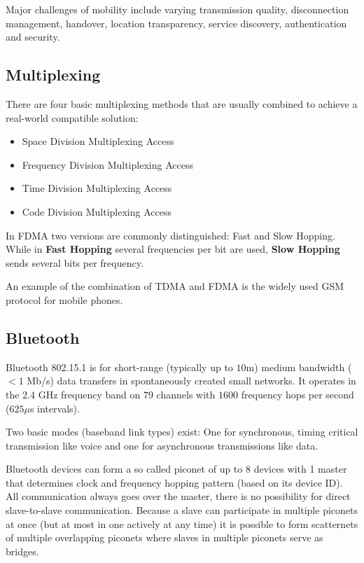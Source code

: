 \documentclass{article}
\newlength{\wideitemsep}
\let\olditem\item
\renewcommand{\item}{\setlength{\itemsep}{\wideitemsep}\olditem}
\begin{document}
\begin{multicols}{2}
Major challenges of mobility include varying transmission quality, disconnection
management, handover, location transparency, service discovery,
authentication and security.

\subsection{Multiplexing}
There are four basic multiplexing methods that are usually combined to achieve a
real-world compatible solution:
\begin{itemize}
    \item Space Division Multiplexing Access
    \item Frequency Division Multiplexing Access
    \item Time Division Multiplexing Access
    \item Code Division Multiplexing Access
\end{itemize}

In FDMA two versions are commonly distinguished: Fast and Slow Hopping. While in
{\bf Fast Hopping} several frequencies per bit are used, {\bf Slow Hopping}
sends several bits per frequency.

An example of the combination of TDMA and FDMA is the widely used GSM protocol
for mobile phones.

\subsection{Bluetooth}
Bluetooth 802.15.1 is for short-range (typically up to $10$m) medium bandwidth
($< 1$ Mb/s) data transfers in spontaneously created small networks. It operates
in the $2.4$ GHz frequency band on $79$ channels with $1600$ frequency hops per
second ($625 \mu$s intervals).

Two basic modes (baseband link types) exist: One for synchronous, timing
critical transmission like voice and one for asynchronous transmissions like data.

Bluetooth devices can form a so called piconet of up to 8 devices with 1 master
that determines clock and frequency hopping pattern (based on its device ID).
All communication always goes over the master, there is no possibility for
direct slave-to-slave communication. Because a slave can participate in multiple
piconets at once (but at most in one actively at any time) it is possible to
form scatternets of multiple overlapping piconets where slaves in multiple
piconets serve as bridges.


\end{multicols}
\end{document}

